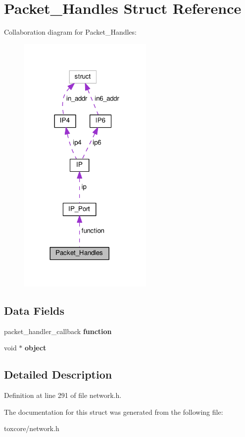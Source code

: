 \hypertarget{struct_packet___handles}{\section{Packet\+\_\+\+Handles Struct Reference}
\label{struct_packet___handles}
}


Collaboration diagram for Packet\+\_\+\+Handles\+:\nopagebreak
\begin{figure}[H]
\begin{center}
\leavevmode
\includegraphics[width=185pt]{struct_packet___handles__coll__graph}
\end{center}
\end{figure}
\subsection*{Data Fields}
\begin{DoxyCompactItemize}
\item 
\hypertarget{struct_packet___handles_a197979c60c06b39ac717b08f5091dd0e}{packet\+\_\+handler\+\_\+callback {\bfseries function}}\label{struct_packet___handles_a197979c60c06b39ac717b08f5091dd0e}

\item 
\hypertarget{struct_packet___handles_a077376d12464f945e2414d5499c79b3f}{void $\ast$ {\bfseries object}}\label{struct_packet___handles_a077376d12464f945e2414d5499c79b3f}

\end{DoxyCompactItemize}


\subsection{Detailed Description}


Definition at line 291 of file network.\+h.



The documentation for this struct was generated from the following file\+:\begin{DoxyCompactItemize}
\item 
toxcore/network.\+h\end{DoxyCompactItemize}
